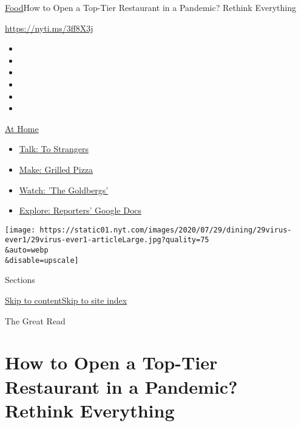 \href{/section/food}{Food}\textbar{}How to Open a Top-Tier Restaurant in
a Pandemic? Rethink Everything

\url{https://nyti.ms/3ff8X3j}

\begin{itemize}
\item
\item
\item
\item
\item
\item
\end{itemize}

\href{https://www.nytimes.com/spotlight/at-home?action=click\&pgtype=Article\&state=default\&region=TOP_BANNER\&context=at_home_menu}{At
Home}

\begin{itemize}
\tightlist
\item
  \href{https://www.nytimes.com/2020/08/03/well/family/the-benefits-of-talking-to-strangers.html?action=click\&pgtype=Article\&state=default\&region=TOP_BANNER\&context=at_home_menu}{Talk:
  To Strangers}
\item
  \href{https://www.nytimes.com/2020/08/01/at-home/coronavirus-make-pizza-on-a-grill.html?action=click\&pgtype=Article\&state=default\&region=TOP_BANNER\&context=at_home_menu}{Make:
  Grilled Pizza}
\item
  \href{https://www.nytimes.com/2020/07/31/arts/television/goldbergs-abc-stream.html?action=click\&pgtype=Article\&state=default\&region=TOP_BANNER\&context=at_home_menu}{Watch:
  'The Goldbergs'}
\item
  \href{https://www.nytimes.com/interactive/2020/at-home/even-more-reporters-editors-diaries-lists-recommendations.html?action=click\&pgtype=Article\&state=default\&region=TOP_BANNER\&context=at_home_menu}{Explore:
  Reporters' Google Docs}
\end{itemize}

\texttt{[image: https://static01.nyt.com/images/2020/07/29/dining/29virus-ever1/29virus-ever1-articleLarge.jpg?quality=75\\\&auto=webp\\\&disable=upscale]}

Sections

\protect\hyperlink{site-content}{Skip to
content}\protect\hyperlink{site-index}{Skip to site index}

The Great Read

\hypertarget{how-to-open-a-top-tier-restaurant-in-a-pandemic-rethink-everything}{%
\section{How to Open a Top-Tier Restaurant in a Pandemic? Rethink
Everything}\label{how-to-open-a-top-tier-restaurant-in-a-pandemic-rethink-everything}}

